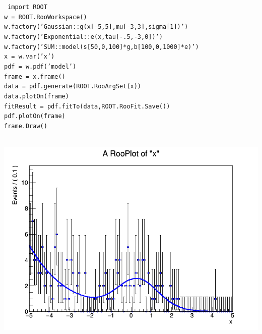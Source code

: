 \documentclass[landscape,a0paper,fontscale=0.33]{baposter} %
\begin{document}
\begin{poster}
{\begin{tcolorbox}[colback=blue!5!white,colframe=blue!75!black,title=A Simple Example]
\tt{
import ROOT\\
w = ROOT.RooWorkspace()\\
w.factory('Gaussian::g(x[-5,5],mu[-3,3],sigma[1])')\\
w.factory('Exponential::e(x,tau[-.5,-3,0])')\\
w.factory('SUM::model(s[50,0,100]*g,b[100,0,1000]*e)')\\
x = w.var('x')\\
pdf = w.pdf('model')\\
frame = x.frame()\\
data = pdf.generate(ROOT.RooArgSet(x))\\
data.plotOn(frame)\\
fitResult = pdf.fitTo(data,ROOT.RooFit.Save())\\
pdf.plotOn(frame)\\
frame.Draw()\\
}
\begin{center}\includegraphics[width=0.75\linewidth]{simpleexample01}\end{center}
\end{tcolorbox}
}








\end{poster}
\end{document}
